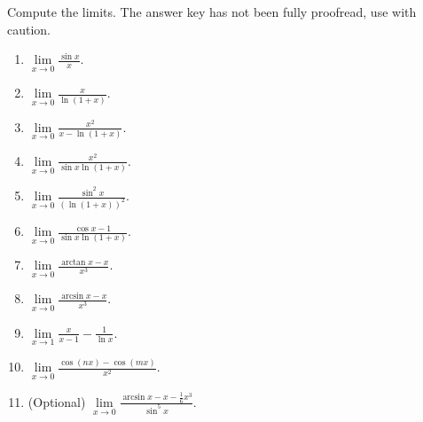 Compute the limits. The answer key has not been fully proofread, use with caution.
\begin{multicols}{2}
\begin{enumerate}
\item $\lim\limits_{x\to 0} \frac{\sin x  }{x}$. 
\item $\lim\limits_{x\to 0} \frac{x}{\ln (1+x)}$. 
\item $\lim\limits_{x\to 0} \frac{x^2}{x-\ln (1+x)}$. 
\item $\lim\limits_{x\to 0} \frac{x^2}{\sin x\ln (1+x)}$. 
\item $\lim\limits_{x\to 0} \frac{\sin^2 x  }{\left(\ln (1+x)\right)^2}$.
\item $\lim\limits_{x\to 0} \frac{\cos x- 1}{\sin x\ln (1+x)}$.
\item $\lim\limits_{x\to 0} \frac{\arctan x -x}{x^3} $.
\item $\lim\limits_{x\to 0} \frac{\arcsin x -x}{x^3} $.
\item $\lim\limits_{x\to 1} \frac{x}{x-1}-\frac{1}{\ln x}$.
\item $\lim\limits_{x\to 0} \frac{\cos (nx) -\cos (mx)}{x^2 }$.
\item (Optional)  $\lim \limits_{x\to 0} \frac{\arcsin x-x-\frac{1}{6}x^3}{\sin^5 x} $. 
\end{enumerate}
\end{multicols}